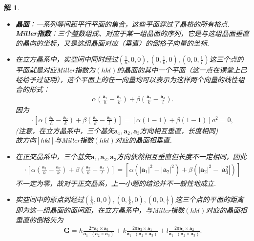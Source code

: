 \documentclass[UTF8,10pt,a4paper]{article}
\theoremstyle{Problem}
\theoremstyle{Solution}
\newtheorem*{sol}{解}
\providecommand{\abs}[1]{\left\lvert#1\right\rvert}
\begin{document}
\begin{sol}
    \begin{itemize}
        \item[$\triangleright$] \textbf{晶面}：一系列等间距平行平面的集合，这些平面穿过了晶格的所有格点.\\
        \textbf{Miller指数}：三个整数组成、对应于某一组晶面的序列，它是与这组晶面垂直的晶向的坐标，又是这组晶面对应（垂直）的倒格子向量的坐标.
        \item[$\triangleright$] 在立方晶系中，实空间中同时经过$(\frac{1}{h},0,0),(0,\frac{1}{k},0),(0,0,\frac{1}{l})$这三个点的平面就是对应Miller指数为$(hkl)$的晶面的其中一个平面（这一点在课堂上已经给予过证明），这个平面上的任一向量均可以表示为这样两个向量的线性组合的形式：
        \begin{align*}
            \alpha(\frac{\bm{a}_1}{h}-\frac{\bm{a}_2}{k})+\beta(\frac{\bm{a}_2}{k}-\frac{\bm{a}_3}{l}).
        \end{align*}
        因为
        \begin{align}
            [h\bm{a}_1+k\bm{a}_2+l\bm{a}_3]\cdot[\alpha(\frac{\bm{a}_1}{h}-\frac{\bm{a}_2}{k})+\beta(\frac{\bm{a}_2}{k}-\frac{\bm{a}_3}{l})]=[\alpha(1-1)+\beta(1-1)]a^2=0,
        \end{align}
        (注意，在立方晶系中，三个基矢$\bm{a}_1,\bm{a}_2,\bm{a}_3$方向相互垂直，长度相同)\\
        故方向$[hkl]$与Miller指数$(hkl)$对应的晶面相垂直.
        \item[$\triangleright$] 在正交晶系中，三个基矢$\bm{a}_1,\bm{a}_2,\bm{a}_3$方向依然相互垂直但长度不一定相同，因此
        \begin{align}
            [h\bm{a}_1+k\bm{a}_2+l\bm{a}_3]\cdot[\alpha(\frac{\bm{a}_1}{h}-\frac{\bm{a}_2}{k})+\beta(\frac{\bm{a}_2}{k}-\frac{\bm{a}_3}{l})]=[\alpha(\abs{\bm{a}_1}^2-\abs{\bm{a}_2}^2)+\beta(\abs{\bm{a}_2}^2-\abs{\bm{a}_3^2})]
        \end{align}
        不一定为零，故对于正交晶系，上一小题的结论并不一般性地成立.
        \item[$\triangleright$] 实空间中的原点到经过$(\frac{1}{h},0,0),(0,\frac{1}{k},0),(0,0,\frac{1}{l})$这三个点的平面的距离即为这一组晶面的面间距，在立方晶系中，与Miller指数$(hkl)$对应的晶面相垂直的倒格矢为
        \begin{align*}
            \bm{G}=h\frac{2\pi\bm{a}_2\times\bm{a}_3}{\bm{a}_1\cdot(\bm{a}_2\times\bm{a}_3)}+k\frac{2\pi\bm{a}_3\times\bm{a}_1}{\bm{a}_1\cdot(\bm{a}_2\times\bm{a}_3)}+l\frac{2\pi\bm{a}_1\times\bm{a}_2}{\bm{a}_1\cdot(\bm{a}_2\times\bm{a}_3)}.

\end{align*}
\end{itemize}
\end{sol}
\end{document}
